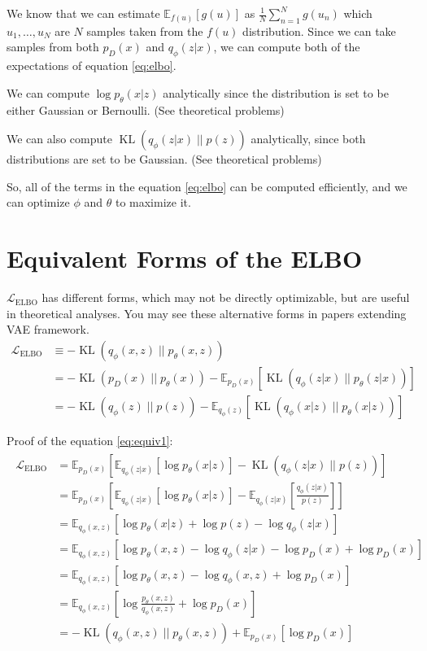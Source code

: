 \documentclass{article}
\newcommand{\kl}[2]{\operatorname{KL}({#1} \; || \; {#2})}
\begin{document}
We know that we can estimate $\mathbb{E}_{f(u)}[g(u)]$ as $\frac{1}{N} \sum_{n=1}^{N} g(u_n)$ which $u_1, \dots, u_N$ are $N$ samples taken from the $f(u)$ distribution.
Since we can take samples from both $p_D(x)$ and $q_\phi(z|x)$, we can compute both of the expectations of equation \ref{eq:elbo}.

We can compute $\log p_\theta(x|z)$ analytically since the distribution is set to be either Gaussian or Bernoulli. (See theoretical problems)

We can also compute $\kl{q_\phi(z|x)}{p(z)}$ analytically, since both distributions are set to be Gaussian. (See theoretical problems)

So, all of the terms in the equation \ref{eq:elbo} can be computed efficiently, and we can optimize $\phi$ and $\theta$ to maximize it.

\section{Equivalent Forms of the ELBO}
$\mathcal{L}_\text{ELBO}$ has different forms, which may not be directly optimizable, but are useful in theoretical analyses. You may see these alternative forms in papers extending VAE framework.
\begin{align}
    \mathcal{L}_\text{ELBO} &\equiv -\kl{q_\phi(x, z)}{p_\theta(x, z)} \label{eq:equiv1}\\
    &= -\kl{p_D(x)}{p_\theta(x)} - \mathbb{E}_{p_D(x)}[\kl{q_\phi(z|x)}{p_\theta(z|x)}] \label{eq:equiv2}\\
    &= -\kl{q_\phi(z)}{p(z)} - \mathbb{E}_{q_\phi(z)}[\kl{q_\phi(x|z)}{p_\theta(x|z)}] \label{eq:equiv3}
\end{align}

Proof of the equation \ref{eq:equiv1}:
\begin{align}
    \begin{split}
        \mathcal{L}_{\text{ELBO}} &= \mathbb{E}_{p_D(x)} \left[ \mathbb{E}_{q_\phi(z|x)}[\log p_\theta(x|z)] - \kl{q_\phi(z|x)}{p(z)} \right] \\
        &= \mathbb{E}_{p_D(x)} \left[ \mathbb{E}_{q_\phi(z|x)}[\log p_\theta(x|z)] - \mathbb{E}_{q_\phi(z|x)}[\frac{q_\phi(z|x)}{p(z)}] \right] \\
        &= \mathbb{E}_{q_\phi(x, z)} \left[ \log p_\theta(x|z) + \log p(z) - \log q_\phi(z|x) \right] \\
        &= \mathbb{E}_{q_\phi(x, z)} \left[ \log p_\theta(x, z) - \log q_\phi(z|x) - \log p_D(x) + \log p_D(x) \right] \\
        &= \mathbb{E}_{q_\phi(x, z)} \left[ \log p_\theta(x, z) - \log q_\phi(x, z) + \log p_D(x) \right] \\
        &= \mathbb{E}_{q_\phi(x, z)} \left[ \log \frac{p_\theta(x, z)}{q_\phi(x, z)} + \log p_D(x) \right] \\
        &= -\kl{q_\phi(x, z)}{p_\theta(x, z)} + \mathbb{E}_{p_D(x)} \left[ \log p_D(x) \right]
    \end{split}
\end{align}
\end{document}
